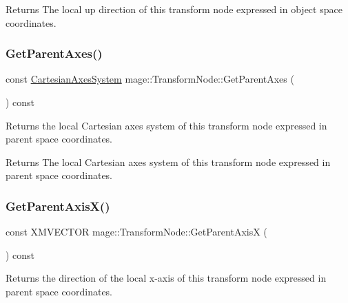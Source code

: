 \begin{DoxyReturn}{Returns}
The local up direction of this transform node expressed in object space coordinates. 
\end{DoxyReturn}
\hypertarget{structmage_1_1_transform_node_a65a2b2cef7a43dfce2e523f78d5eeb13}{}\label{structmage_1_1_transform_node_a65a2b2cef7a43dfce2e523f78d5eeb13} 
\subsubsection{\texorpdfstring{Get\+Parent\+Axes()}{GetParentAxes()}}
{\footnotesize\ttfamily const \hyperlink{structmage_1_1_cartesian_axes_system}{Cartesian\+Axes\+System} mage\+::\+Transform\+Node\+::\+Get\+Parent\+Axes (\begin{DoxyParamCaption}{ }\end{DoxyParamCaption}) const\hspace{0.3cm}{\ttfamily [noexcept]}}

Returns the local Cartesian axes system of this transform node expressed in parent space coordinates.

\begin{DoxyReturn}{Returns}
The local Cartesian axes system of this transform node expressed in parent space coordinates. 
\end{DoxyReturn}
\hypertarget{structmage_1_1_transform_node_ac562bb1036c0bc55c0ededd8fa956fda}{}\label{structmage_1_1_transform_node_ac562bb1036c0bc55c0ededd8fa956fda} 
\subsubsection{\texorpdfstring{Get\+Parent\+Axis\+X()}{GetParentAxisX()}}
{\footnotesize\ttfamily const X\+M\+V\+E\+C\+T\+OR mage\+::\+Transform\+Node\+::\+Get\+Parent\+AxisX (\begin{DoxyParamCaption}{ }\end{DoxyParamCaption}) const\hspace{0.3cm}{\ttfamily [noexcept]}}

Returns the direction of the local x-\/axis of this transform node expressed in parent space coordinates.

